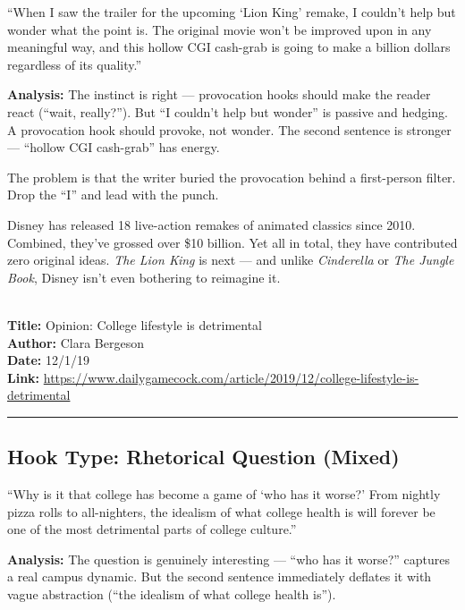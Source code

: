 \documentclass[12pt]{article}
\newcounter{examplenum}
\newcommand{\totalexamples}{10}
\newcommand{\exampleheader}[4]{%
    \newpage
    \stepcounter{examplenum}%
    \noindent{\large\bfseries\color{garnet} Example \theexamplenum\ of \totalexamples}\\[6pt]
    \textbf{Title:} #1\\
    \textbf{Author:} #2\\
    \textbf{Date:} #3\\
    \textbf{Link:} \url{#4}\\[4pt]
    \noindent\rule{\textwidth}{0.4pt}
    \vspace{6pt}
}
\begin{document}
\begin{promptbox}
``When I saw the trailer for the upcoming `Lion King' remake, I couldn't help but wonder what the point is. The original movie won't be improved upon in any meaningful way, and this hollow CGI cash-grab is going to make a billion dollars regardless of its quality.''
\end{promptbox}

\textbf{Analysis:} The instinct is right --- provocation hooks should make the reader react (``wait, really?''). But ``I couldn't help but wonder'' is passive and hedging. A provocation hook should provoke, not wonder. The second sentence is stronger --- ``hollow CGI cash-grab'' has energy.

The problem is that the writer buried the provocation behind a first-person filter. Drop the ``I'' and lead with the punch.

\begin{seasonbox}
Disney has released 18 live-action remakes of animated classics since 2010. Combined, they've grossed over \$10 billion. Yet all in total, they have contributed zero original ideas. \textit{The Lion King} is next --- and unlike \textit{Cinderella} or \textit{The Jungle Book}, Disney isn't even bothering to reimagine it.
\end{seasonbox}

\exampleheader
{Opinion: College lifestyle is detrimental}
{Clara Bergeson}
{12/1/19}
{https://www.dailygamecock.com/article/2019/12/college-lifestyle-is-detrimental}

\subsection*{Hook Type: Rhetorical Question (Mixed)}

\begin{promptbox}
``Why is it that college has become a game of `who has it worse?' From nightly pizza rolls to all-nighters, the idealism of what college health is will forever be one of the most detrimental parts of college culture.''
\end{promptbox}

\textbf{Analysis:} The question is genuinely interesting --- ``who has it worse?'' captures a real campus dynamic. But the second sentence immediately deflates it with vague abstraction (``the idealism of what college health is'').
\end{document}
